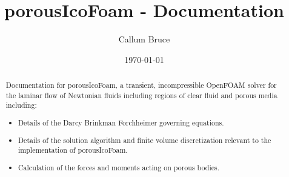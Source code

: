 \documentclass[a4paper,11pt]{report}
\begin{document}
\title{porousIcoFoam - Documentation}
\author{Callum Bruce}
\date{\today}
\maketitle

\begin{abstract}
Documentation for porousIcoFoam, a transient, incompressible OpenFOAM solver for the laminar flow of Newtonian fluids including regions of clear fluid and porous media including:
\begin{itemize}
    \item Details of the Darcy Brinkman Forchheimer governing equations.
    \item Details of the solution algorithm and finite volume discretization relevant to the implementation of porousIcoFoam.
    \item Calculation of the forces and moments acting on porous bodies.
\end{itemize}  
\end{abstract}
\end{document}
